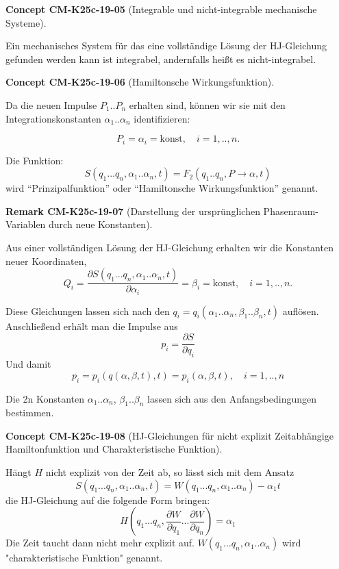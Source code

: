 \documentclass[10pt, letterpaper]{article}
\newcommand{\CustomHeading}[3]{%
  \par\medskip\noindent%
  \textbf{#1 #2} \textnormal{(#3)}.\enskip%
}
\newenvironment{REM}[2]{\CustomHeading{Remark}{#1}{#2}}{}
\newenvironment{CONC}[2]{\CustomHeading{Concept}{#1}{#2}}{}
\begin{document}
\begin{CONC}{CM-K25c-19-05}{Integrable und nicht-integrable mechanische Systeme}
Ein mechanisches System für das eine vollständige Lösung der HJ-Gleichung gefunden werden kann ist integrabel, andernfalls heißt es nicht-integrabel.
\end{CONC}

\begin{CONC}{CM-K25c-19-06}{Hamiltonsche Wirkungsfunktion}
Da die neuen Impulse $P_1..P_n$ erhalten sind, können wir sie mit den Integrationskonstanten $\alpha_1..\alpha_n$ identifizieren:

\[P_i = \alpha_i = \text{konst}, \quad i=1,..,n.\]

Die Funktion:
\[S(q_1...q_n,\alpha_1..\alpha_n,t) = F_2(q_1..q_n,P\rightarrow\alpha,t)\]
wird ``Prinzipalfunktion'' oder ``Hamiltonsche Wirkungsfunktion'' genannt.
\end{CONC}

\begin{REM}{CM-K25c-19-07}{Darstellung der ursprünglichen Phasenraum-Variablen durch neue Konstanten}
Aus einer vollständigen Lösung der HJ-Gleichung erhalten wir die Konstanten neuer Koordinaten,
\[Q_i = \frac{\partial S(q_1...q_n,\alpha_1..\alpha_n,t)}{\partial \alpha_i} = \beta_i = \text{konst}, \quad i=1,..,n.\]

Diese Gleichungen lassen sich nach den $q_i=q_i(\alpha_1..\alpha_n,\beta_1..\beta_n,t)$ auflösen. Anschließend erhält man die Impulse aus
\[p_i = \frac{\partial S}{\partial q_i}\]
Und damit
\[p_i = p_i(q(\alpha,\beta,t),t) = p_i(\alpha,\beta,t), \quad i=1,..,n\]

Die 2n Konstanten $\alpha_1..\alpha_n$, $\beta_1..\beta_n$ lassen sich aus den Anfangsbedingungen bestimmen.
\end{REM}

\begin{CONC}{CM-K25c-19-08}{HJ-Gleichungen für nicht explizit Zeitabhängige Hamiltonfunktion und Charakteristische Funktion}
Hängt $H$ nicht explizit von der Zeit ab, so lässt sich mit dem Ansatz
\[
S(q_1...q_n,\alpha_1..\alpha_n,t) = W(q_1...q_n,\alpha_1..\alpha_n) - \alpha_1t
\]
die HJ-Gleichung auf die folgende Form bringen:
\[
H\left(q_1...q_n,\frac{\partial W}{\partial q_1}...\frac{\partial W}{\partial q_n}\right) = \alpha_1
\]
Die Zeit taucht dann nicht mehr explizit auf. $W(q_1...q_n,\alpha_1..\alpha_n)$ wird "charakteristische Funktion" genannt.
\end{CONC}
\end{document}
